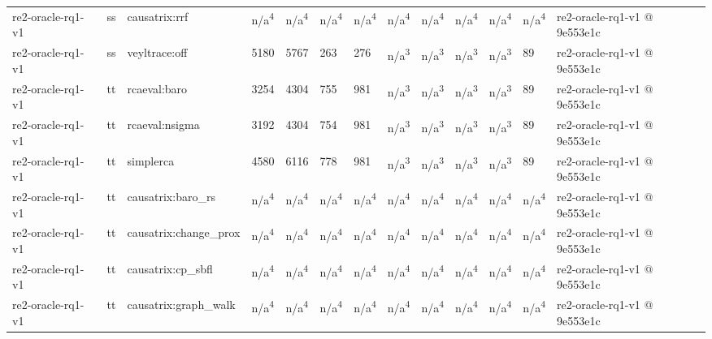 \begin{table}[t]
\begin{tabular}{lllllllllllll}
re2-oracle-rq1-v1 & ss & causatrix:rrf & n/a\textsuperscript{4} & n/a\textsuperscript{4} & n/a\textsuperscript{4} & n/a\textsuperscript{4} & n/a\textsuperscript{4} & n/a\textsuperscript{4} & n/a\textsuperscript{4} & n/a\textsuperscript{4} & n/a\textsuperscript{4} & re2-oracle-rq1-v1 @ 9e553e1c \\
re2-oracle-rq1-v1 & ss & veyltrace:off & 5180 & 5767 & 263 & 276 & n/a\textsuperscript{3} & n/a\textsuperscript{3} & n/a\textsuperscript{3} & n/a\textsuperscript{3} & 89 & re2-oracle-rq1-v1 @ 9e553e1c \\
re2-oracle-rq1-v1 & tt & rcaeval:baro & 3254 & 4304 & 755 & 981 & n/a\textsuperscript{3} & n/a\textsuperscript{3} & n/a\textsuperscript{3} & n/a\textsuperscript{3} & 89 & re2-oracle-rq1-v1 @ 9e553e1c \\
re2-oracle-rq1-v1 & tt & rcaeval:nsigma & 3192 & 4304 & 754 & 981 & n/a\textsuperscript{3} & n/a\textsuperscript{3} & n/a\textsuperscript{3} & n/a\textsuperscript{3} & 89 & re2-oracle-rq1-v1 @ 9e553e1c \\
re2-oracle-rq1-v1 & tt & simplerca & 4580 & 6116 & 778 & 981 & n/a\textsuperscript{3} & n/a\textsuperscript{3} & n/a\textsuperscript{3} & n/a\textsuperscript{3} & 89 & re2-oracle-rq1-v1 @ 9e553e1c \\
re2-oracle-rq1-v1 & tt & causatrix:baro\_rs & n/a\textsuperscript{4} & n/a\textsuperscript{4} & n/a\textsuperscript{4} & n/a\textsuperscript{4} & n/a\textsuperscript{4} & n/a\textsuperscript{4} & n/a\textsuperscript{4} & n/a\textsuperscript{4} & n/a\textsuperscript{4} & re2-oracle-rq1-v1 @ 9e553e1c \\
re2-oracle-rq1-v1 & tt & causatrix:change\_prox & n/a\textsuperscript{4} & n/a\textsuperscript{4} & n/a\textsuperscript{4} & n/a\textsuperscript{4} & n/a\textsuperscript{4} & n/a\textsuperscript{4} & n/a\textsuperscript{4} & n/a\textsuperscript{4} & n/a\textsuperscript{4} & re2-oracle-rq1-v1 @ 9e553e1c \\
re2-oracle-rq1-v1 & tt & causatrix:cp\_sbfl & n/a\textsuperscript{4} & n/a\textsuperscript{4} & n/a\textsuperscript{4} & n/a\textsuperscript{4} & n/a\textsuperscript{4} & n/a\textsuperscript{4} & n/a\textsuperscript{4} & n/a\textsuperscript{4} & n/a\textsuperscript{4} & re2-oracle-rq1-v1 @ 9e553e1c \\
re2-oracle-rq1-v1 & tt & causatrix:graph\_walk & n/a\textsuperscript{4} & n/a\textsuperscript{4} & n/a\textsuperscript{4} & n/a\textsuperscript{4} & n/a\textsuperscript{4} & n/a\textsuperscript{4} & n/a\textsuperscript{4} & n/a\textsuperscript{4} & n/a\textsuperscript{4} & re2-oracle-rq1-v1 @ 9e553e1c \\

\end{tabular}
\end{table}
